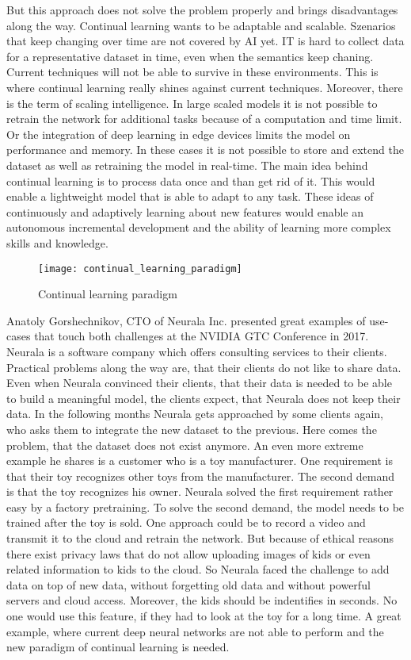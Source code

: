 But this approach does not solve the problem properly and brings disadvantages along the way.
Continual learning wants to be adaptable and scalable.
Szenarios that keep changing over time are not covered by AI yet.
IT is hard to collect data for a representative dataset in time, even when the semantics keep chaning.
Current techniques will not be able to survive in these environments.
This is where continual learning really shines against current techniques.
Moreover, there is the term of scaling intelligence.
In large scaled models it is not possible to retrain the network for additional tasks because of a computation and time limit.
Or the integration of deep learning in edge devices limits the model on performance and memory.
In these cases it is not possible to store and extend the dataset as well as retraining the model in real-time.
The main idea behind continual learning is to process data once and than get rid of it.
This would enable a lightweight model that is able to adapt to any task.
These ideas of continuously and adaptively learning about new features would enable an autonomous incremental development and the ability of learning more complex skills and knowledge.
\cite{continual-ai-blog}

\begin{figure}[H]
    \centering
    \texttt{[image: continual\_learning\_paradigm]}
    \caption{Continual learning paradigm}
\end{figure}

Anatoly Gorshechnikov, CTO of Neurala Inc. presented great examples of use-cases that touch both challenges at the NVIDIA GTC Conference in 2017.
Neurala is a software company which offers consulting services to their clients.
Practical problems along the way are, that their clients do not like to share data.
Even when Neurala convinced their clients, that their data is needed to be able to build a meaningful model, the clients expect, that Neurala does not keep their data.
In the following months Neurala gets approached by some clients again, who asks them to integrate the new dataset to the previous.
Here comes the problem, that the dataset does not exist anymore.
\hfill \break
An even more extreme example he shares is a customer who is a toy manufacturer.
One requirement is that their toy recognizes other toys from the manufacturer.
The second demand is that the toy recognizes his owner.
Neurala solved the first requirement rather easy by a factory pretraining.
To solve the second demand, the model needs to be trained after the toy is sold.
One approach could be to record a video and transmit it to the cloud and retrain the network.
But because of ethical reasons there exist privacy laws that do not allow uploading images of kids or even related information to kids to the cloud.
So Neurala faced the challenge to add data on top of new data, without forgetting old data and without powerful servers and cloud access.
Moreover, the kids should be indentifies in seconds.
No one would use this feature, if they had to look at the toy for a long time.
\hfill \break
A great example, where current deep neural networks are not able to perform and the new paradigm of continual learning is needed.
\cite{neurala_video}


